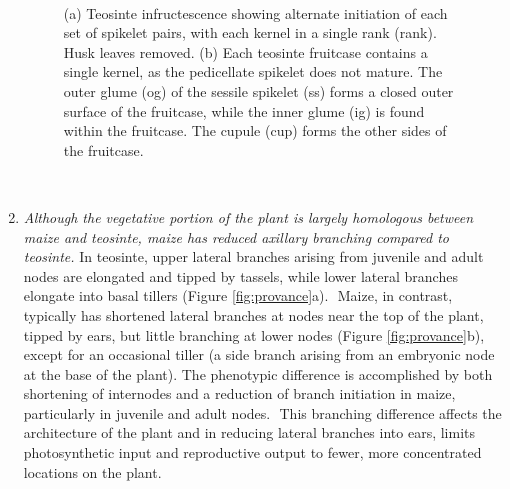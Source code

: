 \documentclass[a4paper]{article}
\begin{document}
\begin{enumerate}
﻿ \begin{figure}
        \caption{\label{fig:teosinte} ﻿(a) Teosinte infructescence showing alternate initiation of each set of spikelet pairs, with each kernel in a single rank (rank). Husk leaves removed. (b) Each teosinte fruitcase contains a single kernel, as the pedicellate spikelet does not mature. The outer glume (og) of the sessile spikelet (ss) forms a closed outer surface of the fruitcase, while the inner glume (ig) is found within the fruitcase. The cupule (cup) forms the other sides of the fruitcase.}
\end{figure}


﻿ \item \textit{Although the vegetative portion of the plant is largely homologous between maize and teosinte, maize has reduced axillary branching compared to teosinte.}
  In teosinte, upper lateral branches arising from juvenile and adult nodes are elongated and tipped by tassels, while lower lateral branches elongate into basal tillers \citep{doebley1997} (Figure \ref{fig:provance}a).
  ﻿ Maize, in contrast, typically has shortened lateral branches at nodes near the top of the plant, tipped by ears, but little branching at lower nodes (Figure \ref{fig:provance}b), except for an occasional tiller (a side branch arising from an embryonic node at the base of the plant).
The phenotypic difference is accomplished by both shortening of internodes and a reduction of branch initiation in maize, particularly in juvenile and adult nodes.
﻿ This branching difference affects the architecture of the plant and in reducing lateral branches into ears, limits photosynthetic input and reproductive output to fewer, more concentrated locations on the plant.

\end{enumerate}
\end{document}
